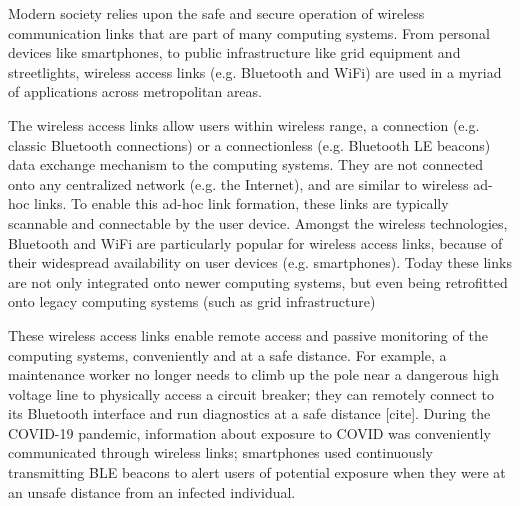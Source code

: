 Modern society relies upon the safe and secure operation of wireless communication links that are part of many computing systems. 
%
From personal devices like smartphones, to public infrastructure like grid equipment and streetlights, wireless access links (e.g. Bluetooth and WiFi) are used in a myriad of applications across metropolitan areas.
%


The wireless access links allow users within wireless range, a connection (e.g. classic Bluetooth connections) or a connectionless (e.g. Bluetooth LE beacons) data exchange mechanism to the computing systems.
%
They are not connected onto any centralized network (e.g. the Internet), and are similar to wireless ad-hoc links.
%
To enable this ad-hoc link formation, these links are typically scannable and connectable by the user device.
%
Amongst the wireless technologies, Bluetooth and WiFi are particularly popular for wireless access links, because of their widespread availability on user devices (e.g. smartphones).
%
Today these links are not only integrated onto newer computing systems, but even being retrofitted onto legacy computing systems (such as grid infrastructure)
%

These wireless access links enable remote access and passive monitoring of the computing systems, conveniently and at a safe distance.
%
For example, a maintenance worker no longer needs to climb up the pole near a dangerous high voltage line to physically access a circuit breaker; they can remotely connect to its Bluetooth interface and run diagnostics at a safe distance [cite].
%
During the COVID-19 pandemic, information about exposure to COVID was conveniently communicated through wireless links;  smartphones used continuously transmitting BLE beacons to alert users of potential exposure when they were at an unsafe distance from an infected individual.
%

